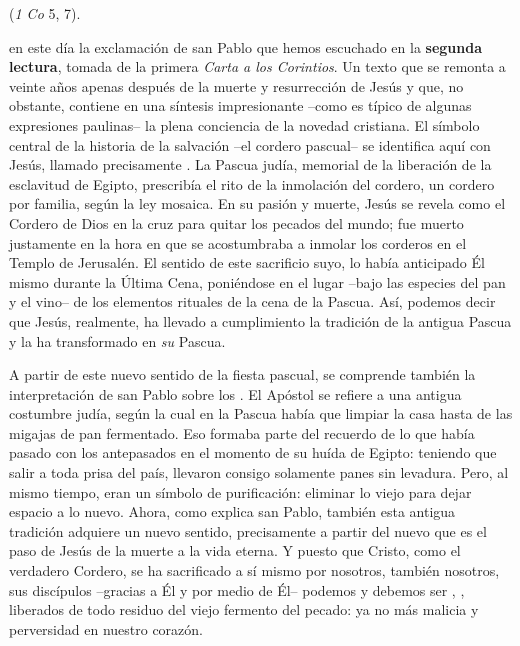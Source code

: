 \begin{body}
 (\textit{1 Co} 5, 7). 

 en este día la exclamación de san Pablo que hemos escuchado en la \textbf{segunda lectura}, tomada de la primera \textit{Carta a los Corintios}. Un texto que se remonta a veinte años apenas después de la muerte y resurrección de Jesús y que, no obstante, contiene en una síntesis impresionante –como es típico de algunas expresiones paulinas– la plena conciencia de la novedad cristiana. El símbolo central de la historia de la salvación –el cordero pascual– se identifica aquí con Jesús, llamado precisamente . La Pascua judía, memorial de la liberación de la esclavitud de Egipto, prescribía el rito de la inmolación del cordero, un cordero por familia, según la ley mosaica. En su pasión y muerte, Jesús se revela como el Cordero de Dios  en la cruz para quitar los pecados del mundo; fue muerto justamente en la hora en que se acostumbraba a inmolar los corderos en el Templo de Jerusalén. El sentido de este sacrificio suyo, lo había anticipado Él mismo durante la Última Cena, poniéndose en el lugar –bajo las especies del pan y el vino– de los elementos rituales de la cena de la Pascua. Así, podemos decir que Jesús, realmente, ha llevado a cumplimiento la tradición de la antigua Pascua y la ha transformado en \textit{su} Pascua. 

A partir de este nuevo sentido de la fiesta pascual, se comprende también la interpretación de san Pablo sobre los . El Apóstol se refiere a una antigua costumbre judía, según la cual en la Pascua había que limpiar la casa hasta de las migajas de pan fermentado. Eso formaba parte del recuerdo de lo que había pasado con los antepasados en el momento de su huída de Egipto: teniendo que salir a toda prisa del país, llevaron consigo solamente panes sin levadura. Pero, al mismo tiempo,  eran un símbolo de purificación: eliminar lo viejo para dejar espacio a lo nuevo. Ahora, como explica san Pablo, también esta antigua tradición adquiere un nuevo sentido, precisamente a partir del nuevo  que es el paso de Jesús de la muerte a la vida eterna. Y puesto que Cristo, como el verdadero Cordero, se ha sacrificado a sí mismo por nosotros, también nosotros, sus discípulos –gracias a Él y por medio de Él– podemos y debemos ser , , liberados de todo residuo del viejo fermento del pecado: ya no más malicia y perversidad en nuestro corazón.


\end{body}
